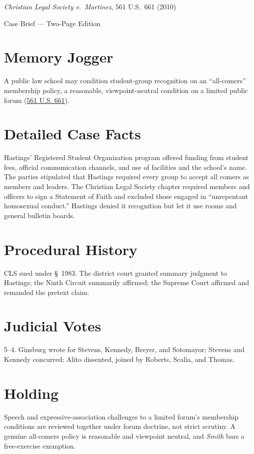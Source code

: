 \documentclass[12pt]{article}
\begin{document}
\begin{center}
{\LARGE \textit{Christian Legal Society v.\ Martinez}, 561 U.S.\ 661 (2010)\par}
\vspace{0.5em}
{\large Case Brief --- Two-Page Edition\par}
\end{center}

\section{Memory Jogger}
A public law school may condition student-group recognition on an ``all-comers'' membership policy, a reasonable, viewpoint-neutral condition on a limited public forum (\href{https://supreme.justia.com/cases/federal/us/561/661/}{561 U.S. 661}).

\section{Detailed Case Facts}
Hastings' Registered Student Organization program offered funding from student fees, official communication channels, and use of facilities and the school's name. The parties stipulated that Hastings required every group to accept all comers as members and leaders. The Christian Legal Society chapter required members and officers to sign a Statement of Faith and excluded those engaged in ``unrepentant homosexual conduct.'' Hastings denied it recognition but let it use rooms and general bulletin boards.

\section{Procedural History}
CLS sued under \S~1983. The district court granted summary judgment to Hastings; the Ninth Circuit summarily affirmed; the Supreme Court affirmed and remanded the pretext claim.

\section{Judicial Votes}
5--4. Ginsburg wrote for Stevens, Kennedy, Breyer, and Sotomayor; Stevens and Kennedy concurred; Alito dissented, joined by Roberts, Scalia, and Thomas.

\section{Holding}
Speech and expressive-association challenges to a limited forum's membership conditions are reviewed together under forum doctrine, not strict scrutiny. A genuine all-comers policy is reasonable and viewpoint neutral, and \textit{Smith} bars a free-exercise exemption.
\end{document}
